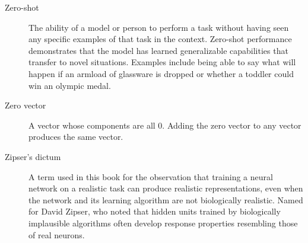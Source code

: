\begin{description}
\item[Zero-shot] The ability of a model or person to perform a task without having seen any specific examples of that task in the context. Zero-shot performance demonstrates that the model has learned generalizable capabilities that transfer to novel situations. Examples include being able to say what will happen if an armload of glassware is dropped or whether a toddler could win an olympic medal.

\item[Zero vector] A vector whose components are all $0$. Adding the zero vector to any vector produces the same vector.

\item[Zipser's dictum] A term used in this book for the observation that training a neural network on a realistic task can produce realistic representations, even when the network and its learning algorithm are not biologically realistic. Named for David Zipser, who noted that hidden units trained by biologically implausible algorithms often develop response properties resembling those of real neurons.
\end{description}
